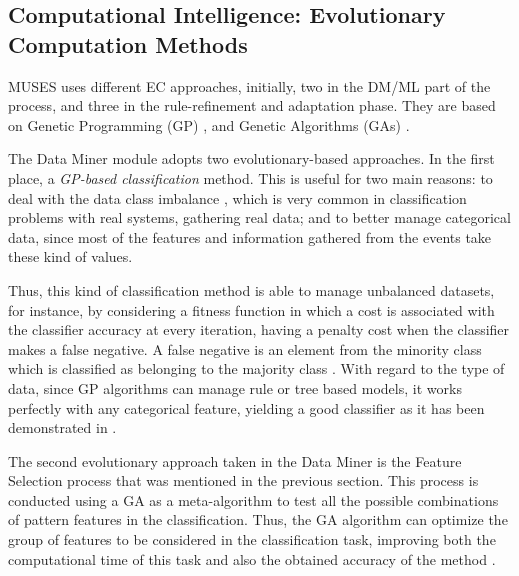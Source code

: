 
%
\subsection{Computational Intelligence: Evolutionary Computation Methods}
\label{subsec:ci}


MUSES uses different EC approaches, initially, two in the DM/ML part of the process, and three in the rule-refinement and adaptation phase. They are based on Genetic Programming (GP) \cite{GP_Koza92}, and Genetic Algorithms (GAs) \cite{GAs_Goldberg89}.

The Data Miner module adopts two evolutionary-based approaches. In the first place, a \textit{GP-based classification} method. This is useful for two main reasons: to deal with the data class imbalance \cite{imbalance_techniques_02}, which is very common in classification problems with real systems, gathering real data; and to better manage categorical data, since most of the features and information gathered from the events take these kind of values.

Thus, this kind of classification method is able to manage unbalanced datasets, for instance, by considering a fitness function in which a cost is associated with the classifier accuracy at every iteration, having a penalty cost when the classifier makes a false negative. A false negative is an element from the minority class which is classified as belonging to the majority class \cite{cost_adjustment_07}.
With regard to the type of data, since GP algorithms can manage rule or tree based models, it works perfectly with any categorical feature, yielding a good classifier as it has been demonstrated in \cite{cost_adjustment_07}.

The second evolutionary approach taken in the Data Miner is the Feature Selection process that was mentioned in the previous section. This process is conducted using a GA as a meta-algorithm to test all the possible combinations of pattern features in the classification. Thus, the GA algorithm can optimize the group of features to be considered in the classification task, improving both the computational time of this task and also the obtained accuracy of the method \cite{liu1998feature}.

